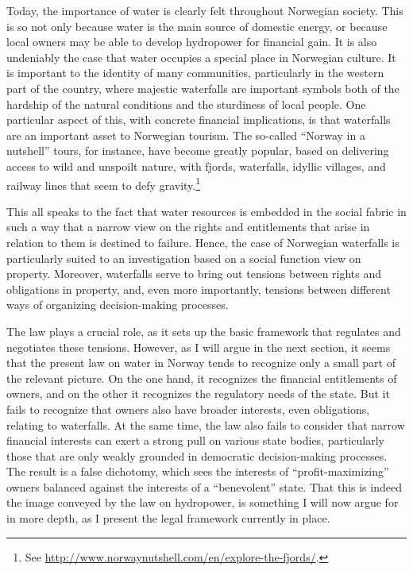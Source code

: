 Today, the importance of water is clearly felt throughout Norwegian society. This is so not only because water is the main source of domestic energy, or because local owners may be able to develop hydropower for financial gain. It is also undeniably the case that water occupies a special place in Norwegian culture. It is important to the identity of many communities, particularly in the western part of the country, where majestic waterfalls are important symbols both of the hardship of the natural conditions and the sturdiness of local people. One particular aspect of this, with concrete financial implications, is that waterfalls are an important asset to Norwegian tourism. The so-called ``Norway in a nutshell'' tours, for instance, have become greatly popular, based on delivering access to wild and unspoilt nature, with fjords, waterfalls, idyllic villages, and railway lines that seem to defy gravity.\footnote{See \url{http://www.norwaynutshell.com/en/explore-the-fjords/}.}

This all speaks to the fact that water resources is embedded in the social fabric in such a way that a narrow view on the rights and entitlements that arise in relation to them is destined to failure. Hence, the case of Norwegian waterfalls is particularly suited to an investigation based on a social function view on property. Moreover, waterfalls serve to bring out tensions between rights and obligations in property, and, even more importantly, tensions between different ways of organizing decision-making processes. 

The law plays a crucial role, as it sets up the basic framework that regulates and negotiates these tensions. However, as I will argue in the next section, it seems that the present law on water in Norway tends to recognize only a small part of the relevant picture. On the one hand, it recognizes the financial entitlements of owners, and on the other it recognizes the regulatory needs of the state. But it fails to recognize that owners also have broader interests, even obligations, relating to waterfalls. At the same time, the law also fails to consider that narrow financial interests can exert a strong pull on various state bodies, particularly those that are only weakly grounded in democratic decision-making processes. The result is a false dichotomy, which sees the interests of ``profit-maximizing'' owners balanced against the interests of a ``benevolent'' state. That this is indeed the image conveyed by the law on hydropower, is something I will now argue for in more depth, as I present the legal framework currently in place. 

